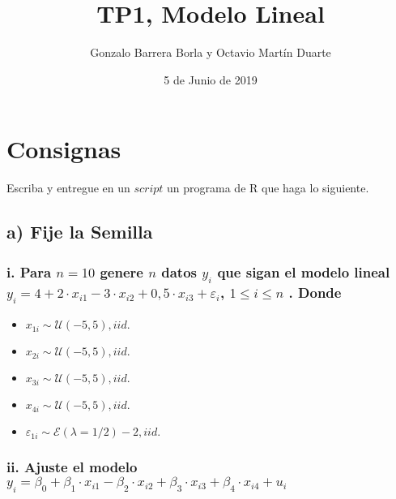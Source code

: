 \documentclass[]{article}
\title{TP1, Modelo Lineal}
\author{Gonzalo Barrera Borla y Octavio Martín Duarte}
\date{5 de Junio de 2019}
\providecommand{\tightlist}{%
  \setlength{\itemsep}{0pt}\setlength{\parskip}{0pt}}
\begin{document}
\maketitle

\hypertarget{consignas}{%
\section{Consignas}\label{consignas}}

Escriba y entregue en un \(script\) un programa de R que haga lo
siguiente.

\hypertarget{a-fije-la-semilla}{%
\subsection{a) Fije la Semilla}\label{a-fije-la-semilla}}

\hypertarget{i.-para-n10-genere-n-datos-y_i-que-sigan-el-modelo-lineal-y_i-42-cdot-x_i1---3-cdot-x_i2-05-cdot-x_i3-varepsilon_i-1-leq-i-leq-n-.-donde}{%
\subsubsection{\texorpdfstring{i. Para \(n=10\) genere \(n\) datos
\(y_i\) que sigan el modelo lineal
\(y_i = 4+2 \cdot x_{i1} - 3 \cdot x_{i2} + 0,5 \cdot x_{i3} + {\varepsilon}_i\),
\(1 \leq i \leq n\) .
Donde}{i. Para n=10 genere n datos y\_i que sigan el modelo lineal y\_i = 4+2 \textbackslash cdot x\_\{i1\} - 3 \textbackslash cdot x\_\{i2\} + 0,5 \textbackslash cdot x\_\{i3\} + \{\textbackslash varepsilon\}\_i, 1 \textbackslash leq i \textbackslash leq n . Donde}}\label{i.-para-n10-genere-n-datos-y_i-que-sigan-el-modelo-lineal-y_i-42-cdot-x_i1---3-cdot-x_i2-05-cdot-x_i3-varepsilon_i-1-leq-i-leq-n-.-donde}}

\begin{itemize}
\tightlist
\item
  \(x_{1i} \sim \mathcal{U}(-5,5) ,iid.\)
\item
  \(x_{2i} \sim \mathcal{U}(-5,5) ,iid.\)
\item
  \(x_{3i} \sim \mathcal{U}(-5,5) ,iid.\)
\item
  \(x_{4i} \sim \mathcal{U}(-5,5) ,iid.\)
\item
  \(\varepsilon_{1i} \sim \mathcal{E}(\lambda=1/2)-2 ,iid.\)
\end{itemize}

\hypertarget{ii.-ajuste-el-modelo-y_i-beta_0beta_1-cdot-x_i1--beta_2-cdot-x_i2-beta_3-cdot-x_i3-beta_4-cdot-x_i4-u_i}{%
\subsubsection{\texorpdfstring{ii. Ajuste el modelo
\(y_i = \beta_0+\beta_1 \cdot x_{i1} -\beta_{2} \cdot x_{i2} + \beta_{3} \cdot x_{i3} + \beta_{4} \cdot x_{i4} + u_i\)}{ii. Ajuste el modelo y\_i = \textbackslash beta\_0+\textbackslash beta\_1 \textbackslash cdot x\_\{i1\} -\textbackslash beta\_\{2\} \textbackslash cdot x\_\{i2\} + \textbackslash beta\_\{3\} \textbackslash cdot x\_\{i3\} + \textbackslash beta\_\{4\} \textbackslash cdot x\_\{i4\} + u\_i}}\label{ii.-ajuste-el-modelo-y_i-beta_0beta_1-cdot-x_i1--beta_2-cdot-x_i2-beta_3-cdot-x_i3-beta_4-cdot-x_i4-u_i}}
\end{document}
